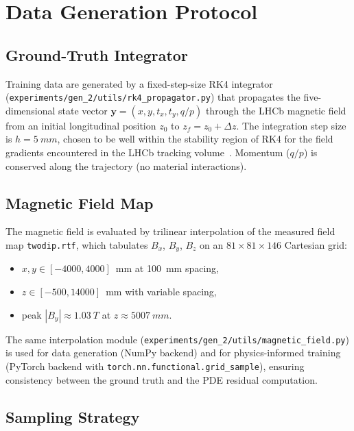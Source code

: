 \documentclass[a4paper,11pt]{article}
\newcommand{\SI}[2]{#1~#2}
\newcommand{\tesla}{T}
\newcommand{\mm}{mm}
\newcommand{\dz}{\Delta z}
\newcommand{\state}{\mathbf{y}}
\begin{document}
\section{Data Generation Protocol}
\label{sec:data_generation}

\subsection{Ground-Truth Integrator}

Training data are generated by a fixed-step-size RK4 integrator
(\texttt{experiments/\allowbreak gen\_2/\allowbreak utils/\allowbreak rk4\_propagator.py}) that propagates the
five-dimensional state vector
$\state = (x, y, t_x, t_y, q/p)$
through the LHCb magnetic field from an initial longitudinal position
$z_0$ to $z_f = z_0 + \dz$.  The integration step size is
$h = \SI{5}{\mm}$, chosen to be well within the stability region of RK4
for the field gradients encountered in the LHCb tracking
volume~\cite{RK4_extrapolator}.  Momentum ($q/p$) is conserved along the
trajectory (no material interactions).

\subsection{Magnetic Field Map}

The magnetic field is evaluated by trilinear interpolation of the measured
field map \texttt{twodip.rtf}, which tabulates $B_x$, $B_y$, $B_z$ on an
$81 \times 81 \times 146$ Cartesian grid:
\begin{itemize}
  \item $x, y \in [-4000, 4000]$~mm at \SI{100}{\mm} spacing,
  \item $z \in [-500, 14000]$~mm with variable spacing,
  \item peak $|B_y| \approx \SI{1.03}{\tesla}$ at $z \approx \SI{5007}{\mm}$.
\end{itemize}
The same interpolation module
(\texttt{experiments/gen\_2/utils/magnetic\_field.py}) is used for data
generation (NumPy backend) and for physics-informed training (PyTorch
backend with \texttt{torch.nn.functional.grid\_sample}), ensuring
consistency between the ground truth and the PDE residual computation.

\subsection{Sampling Strategy}
\end{document}
